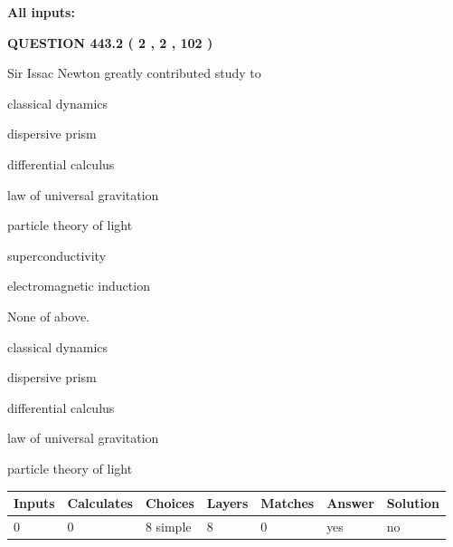 \documentclass[12pt]{article}
\begin{document}
   
   
   
\noindent{}
   
   
   
   
\noindent\vspace{0.1in}\hspace{-0.08in} {\textbf{\Large{All inputs: }}}
   
   
  
\vspace{0.2in}
  
{\textbf{\Large{QUESTION
443.2 
 ( 2 , 2 , 102 )
}}}
  
  
Sir Issac Newton greatly contributed study to
 
 
classical dynamics
 
 
dispersive prism
 
 
differential calculus
 
 
law of universal gravitation
 
 
particle theory of light
 
 
superconductivity
 
 
electromagnetic induction
 
 
 None of above.
 
 
\noindent{}
 
 
classical dynamics
 
 
dispersive prism
 
 
differential calculus
 
 
law of universal gravitation
 
 
particle theory of light
 
 
\noindent{}
 
 
   
   
   
   
\noindent\begin{tabular}{|l|l|l|l|l|l|l|}
 \hline
Inputs & Calculates & Choices & Layers & Matches & Answer & Solution \\ \hline
 0  & 
 0  & 
 8
  simple  
  & 
 8  & 
 0  & 
  yes & 
  no 
  \\ \hline
 \end{tabular}
   
\end{document}
